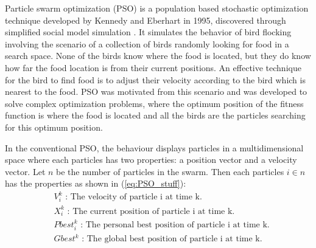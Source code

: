 \documentclass{pdfmx4020}
\begin{document}

    Particle swarm optimization (PSO) is a population based  stochastic optimization technique developed by Kennedy and  Eberhart in 1995, discovered through simplified social model simulation \cite{pso,pso2,pso3,pso4}. It simulates the behavior of bird flocking involving the scenario of a collection of birds randomly looking for food in a search space. None of the birds know where the food is located, but they do know how far the food location is from their current positions. An effective technique for the bird to find food is to adjust their velocity according to the bird which is nearest to the food. PSO was motivated from this scenario and was developed to solve complex optimization problems, where the optimum position of the fitness function is where the food is located and all the birds are the particles searching for this optimum position. 

    In the conventional PSO, the behaviour displays particles in a multidimensional space where each particles has two properties: a position vector and a velocity vector. Let $n$ be the number of particles in the swarm.  Then each particles $i \in n$ has the properties as shown in (\ref{eq:PSO_stuff}):
    \begin{equation} \label{eq:PSO_stuff}
      \begin{split}
        & V_i^k \text{ : The velocity of particle i at time k.} \\
        & X_i^k \text{ : The current position of particle i at time k.} \\
        & Pbest_i^k \text{ : The personal best position of particle i at time k.} \\
        & Gbest^k \text{ : The global best position of particle i at time k.} \\
      \end{split}
    \end{equation}
\end{document}
